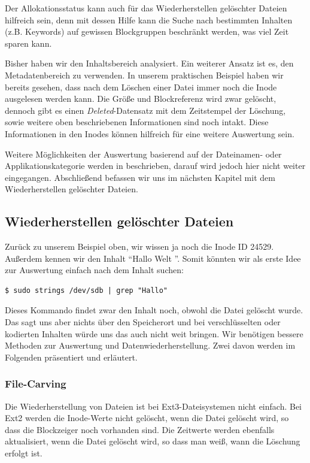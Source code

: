 Der Allokationsstatus kann auch für das Wiederherstellen gelöschter Dateien hilfreich sein, denn mit dessen Hilfe kann die Suche nach bestimmten Inhalten (z.B. Keywords) auf gewissen Blockgruppen beschränkt werden, was viel Zeit sparen kann. 

Bisher haben wir den Inhaltsbereich analysiert. Ein weiterer Ansatz ist es, den Metadatenbereich zu verwenden. In unserem praktischen Beispiel haben wir bereits gesehen, dass nach dem Löschen einer Datei immer noch die Inode ausgelesen werden kann. Die Größe und Blockreferenz wird zwar gelöscht, dennoch gibt es einen \textit{Deleted}-Datensatz mit dem Zeitstempel der Löschung, sowie weitere oben beschriebenen Informationen sind noch intakt. Diese Informationen in den Inodes können hilfreich für eine weitere Auswertung sein.

Weitere Möglichkeiten der Auswertung basierend auf der Dateinamen- oder Applikationskategorie werden in \cite{Carrier.06.01.2022} beschrieben, darauf wird jedoch hier nicht weiter eingegangen. Abschließend befassen wir uns im nächsten Kapitel mit dem Wiederherstellen gelöschter Dateien. 

\subsection{Wiederherstellen gelöschter Dateien}

Zurück zu unserem Beispiel oben, wir wissen ja noch die Inode ID 24529. Außerdem kennen wir den Inhalt "`Hallo Welt "'. Somit könnten wir als erste Idee zur Auswertung einfach nach dem Inhalt suchen:

\begin{lstlisting}
$ sudo strings /dev/sdb | grep "Hallo"
\end{lstlisting}
 
Dieses Kommando findet zwar den Inhalt noch, obwohl die Datei gelöscht wurde. Das sagt uns aber nichts über den Speicherort  und bei verschlüsselten oder kodierten Inhalten würde uns das auch nicht weit bringen. Wir benötigen bessere Methoden zur Auswertung und Datenwiederherstellung. Zwei davon werden im Folgenden präsentiert und erläutert.

\subsubsection{File-Carving}

Die Wiederherstellung von Dateien ist bei Ext3-Dateisystemen nicht einfach. Bei Ext2 werden die Inode-Werte nicht gelöscht, wenn die Datei gelöscht wird, so dass die Blockzeiger noch vorhanden sind. Die Zeitwerte werden ebenfalls aktualisiert, wenn die Datei gelöscht wird, so dass man weiß, wann die Löschung erfolgt ist.

